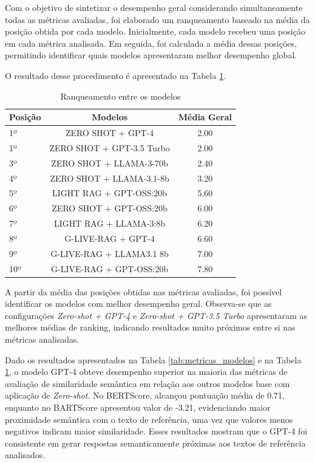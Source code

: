 Com o objetivo de sintetizar o desempenho geral considerando simultaneamente todas as métricas avaliadas, foi elaborado um ranqueamento baseado na média da posição obtida por cada modelo. Inicialmente, cada modelo recebeu uma posição em cada métrica analisada. Em seguida, foi calculada a média dessas posições, permitindo identificar quais modelos apresentaram melhor desempenho global.

O resultado desse procedimento é apresentado na Tabela \ref{tab:rank_models}.
\begin{table}[H]
\centering

\begin{tabular}{lcc}
\toprule
\textbf{Posição} & \textbf{Modelos} & \textbf{Média Geral} \\
\midrule
   
     1º     &   ZERO SHOT + GPT-4             & 2.00   \\
     1º     &   ZERO SHOT + GPT-3.5 Turbo     & 2.00   \\
     3º     &   ZERO SHOT + LLAMA-3-70b       & 2.40   \\
     4º     &   ZERO SHOT + LLAMA-3.1-8b      & 3.20   \\
     
     5º     &   LIGHT RAG + GPT-OSS:20b       & 5.60   \\

     6º     &   ZERO SHOT + GPT-OSS:20b       & 6.00   \\
     7º     &   LIGHT RAG + LLAMA-3:8b        & 6.20   \\
    
     8º     &   G-LIVE-RAG + GPT-4            & 6.60   \\
     9º     &   G-LIVE-RAG + LLAMA3.1 8b      & 7.00   \\
    10º     &   G-LIVE-RAG + GPT-OSS:20b      & 7.80   \\

\bottomrule
\end{tabular}
\caption{Ranqueamento entre os modelos}
\label{tab:rank_models}
\end{table}

A partir da média das posições obtidas nas métricas avaliadas, foi possível identificar os modelos com melhor desempenho geral. Observa-se que as configurações \textit{Zero-shot + GPT-4} e \textit{Zero-shot + GPT-3.5 Turbo} apresentaram as melhores médias de ranking, indicando resultados muito próximos entre si nas métricas analisadas.

Dado os resultados apresentados na Tabela \ref{tab:metricas_modelos} e na Tabela \ref{tab:rank_models}, o modelo GPT-4 obteve desempenho superior na maioria das métricas de avaliação de similaridade semântica em relação aos outros modelos base com aplicação de \textit{Zero-shot}. No BERTScore, alcançou pontuação média de 0.71, enquanto no BARTScore apresentou valor de -3.21, evidenciando maior proximidade semântica com o texto de referência, uma vez que valores menos negativos indicam maior similaridade. Esses resultados mostram que o GPT-4 foi consistente em gerar respostas semanticamente próximas aos textos de referência analisados. 

